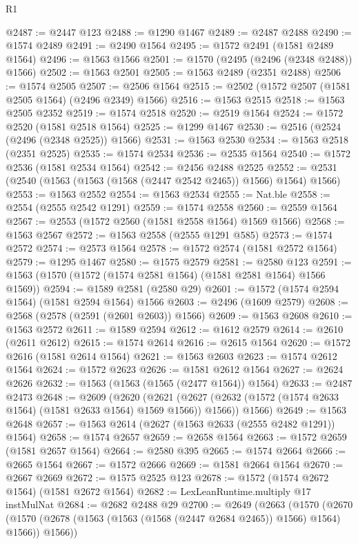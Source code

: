 \begin{lexlean}{R1}
\begin{coremodule}
@2487 := @2447 @123
@2488 := @1290 @1467
@2489 := @2487 @2488
@2490 := @1574 @2489
@2491 := @2490 @1564
@2495 := @1572 @2491 (@1581 @2489 @1564)
@2496 := @1563 @1566
@2501 := @1570 (@2495 (@2496 (@2348 @2488)) @1566)
@2502 := @1563 @2501
@2505 := @1563 @2489 (@2351 @2488)
@2506 := @1574 @2505
@2507 := @2506 @1564
@2515 := @2502 (@1572 @2507 (@1581 @2505 @1564) (@2496 @2349) @1566)
@2516 := @1563 @2515
@2518 := @1563 @2505 @2352
@2519 := @1574 @2518
@2520 := @2519 @1564
@2524 := @1572 @2520 (@1581 @2518 @1564)
@2525 := @1299 @1467
@2530 := @2516 (@2524 (@2496 (@2348 @2525)) @1566)
@2531 := @1563 @2530
@2534 := @1563 @2518 (@2351 @2525)
@2535 := @1574 @2534
@2536 := @2535 @1564
@2540 := @1572 @2536 (@1581 @2534 @1564)
@2542 := @2456 @2488 @2525
@2552 := @2531 (@2540 (@1563 (@1563 (@1568 (@2447 @2542 @2465)) @1566) @1564) @1566)
@2553 := @1563 @2552
@2554 := @1563 @2534
@2555 := Nat.ble
@2558 := @2554 (@2555 @2542 @1291)
@2559 := @1574 @2558
@2560 := @2559 @1564
@2567 := @2553 (@1572 @2560 (@1581 @2558 @1564) @1569 @1566)
@2568 := @1563 @2567
@2572 := @1563 @2558 (@2555 @1291 @585)
@2573 := @1574 @2572
@2574 := @2573 @1564
@2578 := @1572 @2574 (@1581 @2572 @1564)
@2579 := @1295 @1467
@2580 := @1575 @2579
@2581 := @2580 @123
@2591 := @1563 (@1570 (@1572 (@1574 @2581 @1564) (@1581 @2581 @1564) @1566 @1569))
@2594 := @1589 @2581 (@2580 @29)
@2601 := @1572 (@1574 @2594 @1564) (@1581 @2594 @1564) @1566
@2603 := @2496 (@1609 @2579)
@2608 := @2568 (@2578 (@2591 (@2601 @2603)) @1566)
@2609 := @1563 @2608
@2610 := @1563 @2572
@2611 := @1589 @2594
@2612 := @1612 @2579
@2614 := @2610 (@2611 @2612)
@2615 := @1574 @2614
@2616 := @2615 @1564
@2620 := @1572 @2616 (@1581 @2614 @1564)
@2621 := @1563 @2603
@2623 := @1574 @2612 @1564
@2624 := @1572 @2623
@2626 := @1581 @2612 @1564
@2627 := @2624 @2626
@2632 := @1563 (@1563 (@1565 (@2477 @1564)) @1564)
@2633 := @2487 @2473
@2648 := @2609
    (@2620
      (@2621 (@2627 (@2632 (@1572 (@1574 @2633 @1564) (@1581 @2633 @1564) @1569 @1566)) @1566))
      @1566)
@2649 := @1563 @2648
@2657 := @1563 @2614 (@2627 (@1563 @2633 (@2555 @2482 @1291)) @1564)
@2658 := @1574 @2657
@2659 := @2658 @1564
@2663 := @1572 @2659 (@1581 @2657 @1564)
@2664 := @2580 @395
@2665 := @1574 @2664
@2666 := @2665 @1564
@2667 := @1572 @2666
@2669 := @1581 @2664 @1564
@2670 := @2667 @2669
@2672 := @1575 @2525 @123
@2678 := @1572 (@1574 @2672 @1564) (@1581 @2672 @1564)
@2682 := LexLeanRuntime.multiply @17 instMulNat
@2684 := @2682 @2488 @29
@2700 := @2649
    (@2663
      (@1570
        (@2670 (@1570 (@2678 (@1563 (@1563 (@1568 (@2447 @2684 @2465)) @1566) @1564) @1566)) @1566))

\end{coremodule}
\end{lexlean}
